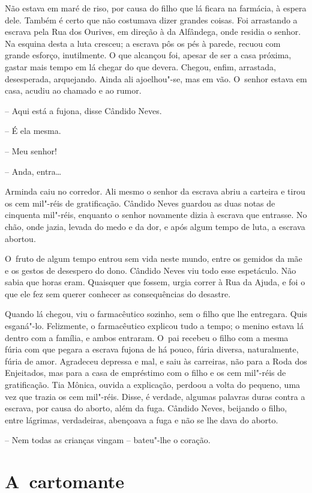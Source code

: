 Não estava em maré de riso, por causa do filho que lá ficara na
farmácia, à espera dele. Também é certo que não costumava dizer grandes
coisas. Foi arrastando a escrava pela Rua dos Ourives, em direção à da
Alfândega, onde residia o senhor. Na esquina desta a luta cresceu; a
escrava pôs os pés à parede, recuou com grande esforço, inutilmente. O
que alcançou foi, apesar de ser a casa próxima, gastar mais tempo em lá
chegar do que devera. Chegou, enfim, arrastada, desesperada, arquejando.
Ainda ali ajoelhou"-se, mas em vão. O~senhor estava em casa, acudiu ao
chamado e ao rumor.

-- Aqui está a fujona, disse Cândido Neves.

-- É ela mesma.

-- Meu senhor!

-- Anda, entra\ldots{}

Arminda caiu no corredor. Ali mesmo o senhor da escrava abriu a carteira
e tirou os cem mil"-réis de gratificação. Cândido Neves guardou as duas
notas de cinquenta mil"-réis, enquanto o senhor novamente dizia à escrava
que entrasse. No chão, onde jazia, levada do medo e da dor, e após algum
tempo de luta, a escrava abortou.

O~fruto de algum tempo entrou sem vida neste mundo, entre os gemidos da
mãe e os gestos de desespero do dono. Cândido Neves viu todo esse
espetáculo. Não sabia que horas eram. Quaisquer que fossem, urgia correr
à Rua da Ajuda, e foi o que ele fez sem querer conhecer as consequências
do desastre.

Quando lá chegou, viu o farmacêutico sozinho, sem o filho que lhe
entregara. Quis esganá"-lo. Felizmente, o farmacêutico explicou tudo a
tempo; o menino estava lá dentro com a família, e ambos entraram. O~pai
recebeu o filho com a mesma fúria com que pegara a escrava fujona de há
pouco, fúria diversa, naturalmente, fúria de amor. Agradeceu depressa e
mal, e saiu às carreiras, não para a Roda dos Enjeitados, mas para a
casa de empréstimo com o filho e os cem mil"-réis de gratificação. Tia
Mônica, ouvida a explicação, perdoou a volta do pequeno, uma vez que
trazia os cem mil"-réis. Disse, é verdade, algumas palavras duras contra
a escrava, por causa do aborto, além da fuga. Cândido Neves, beijando o
filho, entre lágrimas, verdadeiras, abençoava a fuga e não se lhe dava
do aborto.

-- Nem todas as crianças vingam ­-- bateu"-lhe o coração.

\chapter{A~cartomante}

